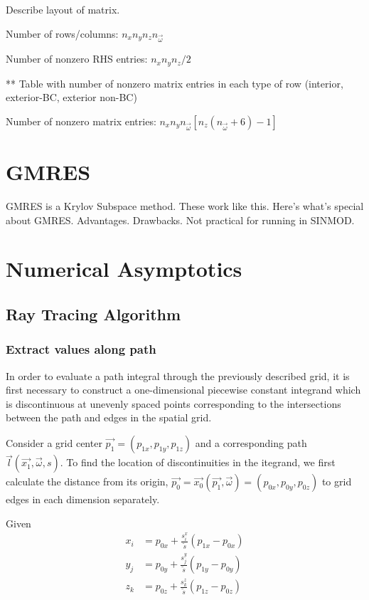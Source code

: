 Describe layout of matrix.

Number of rows/columns: $n_xn_yn_zn_{\vec{\omega}}$

Number of nonzero RHS entries: $n_xn_yn_z/2$

** Table with number of nonzero matrix entries in each type of row (interior,
exterior-BC, exterior non-BC)

Number of nonzero matrix entries: $n_xn_yn_{\vec{\omega}} \left[n_z(n_{\vec{\omega}}+6)-1 \right]$

\section{GMRES}
GMRES is a Krylov Subspace method. These work like this. Here's what's special
about GMRES. Advantages. Drawbacks. Not practical for running in SINMOD.

\section{Numerical Asymptotics}

\subsection{Ray Tracing Algorithm}
\subsubsection{Extract values along path}

In order to evaluate a path integral through the previously described grid, it
is first necessary to construct a one-dimensional piecewise constant integrand
which is discontinuous at unevenly spaced points corresponding to the
intersections between the path and edges in the spatial grid.

Consider a grid center $\vec{p_1} = (p_{1x},p_{1y},p_{1z})$ and a corresponding path $\vec{l}(\vec{x_1}, \vec{\omega}, s)$.
To find the location of discontinuities in the itegrand, we first calculate the
distance from its origin, $\vec{p_0} = \vec{x_0}(\vec{p_1}, \vec{\omega}) = (p_{0x}, p_{0y}, p_{0z})$ to grid edges in each dimension
separately.

Given
\begin{align}
  x_i &= p_{0x} + \frac{s_i^x}{\tilde{s}}(p_{1x}-p_{0x}) \\
  y_j &= p_{0y} + \frac{s_j^y}{\tilde{s}}(p_{1y}-p_{0y}) \\
  z_k &= p_{0z} + \frac{s_k^z}{\tilde{s}}(p_{1z}-p_{0z})
\end{align}

